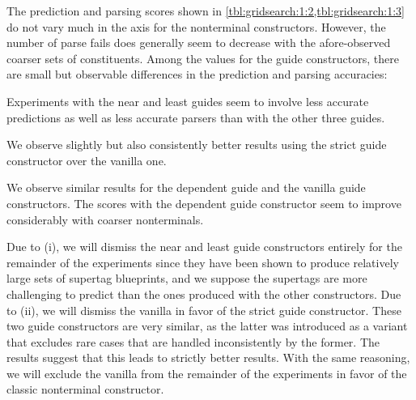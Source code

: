 \documentclass[../../document.tex]{subfiles}
\begin{document}
    The prediction and parsing scores shown in \cref{tbl:gridsearch:1:2,tbl:gridsearch:1:3} do not vary much in the axis for the nonterminal constructors.
    However, the number of parse fails does generally seem to decrease with the afore-observed coarser sets of constituents.
    Among the values for the guide constructors, there are small but observable differences in the prediction and parsing accuracies:
    \begin{compactenum}
        \item Experiments with the near and least guides seem to involve less accurate predictions as well as less accurate parsers than with the other three guides.
        \item We observe slightly but also consistently better results using the strict guide constructor over the vanilla one.
        \item We observe similar results for the dependent guide and the vanilla guide constructors. The scores with the dependent guide constructor seem to improve considerably with coarser nonterminals.
    \end{compactenum}

    Due to (i), we will dismiss the near and least guide constructors entirely for the remainder of the experiments since they have been shown to produce relatively large sets of supertag blueprints, and we suppose the supertags are more challenging to predict than the ones produced with the other constructors.
    Due to (ii), we will dismiss the vanilla in favor of the strict guide constructor.
    These two guide constructors are very similar, as the latter was introduced as a variant that excludes rare cases that are handled inconsistently by the former.
    The results suggest that this leads to strictly better results.
    With the same reasoning, we will exclude the vanilla from the remainder of the experiments in favor of the classic nonterminal constructor.
\end{document}
